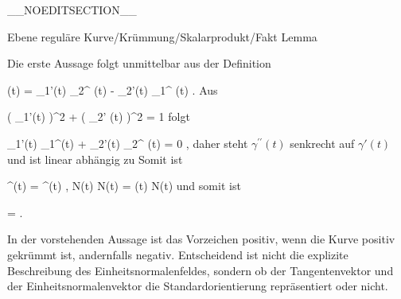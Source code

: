 __NOEDITSECTION__

{Ebene reguläre Kurve/Krümmung/Skalarprodukt/Fakt}
{Lemma}
{}
{

\faktzusatz {}
\faktzusatz {}

}
{

Die erste Aussage folgt unmittelbar aus der Definition

\mavergleichskettedisp
{\vergleichskette
{ \kappa(t)
}
{ =} { \gamma_1'(t) \gamma_2^{\prime \prime} (t) - \gamma_2'(t) \gamma_1^{\prime \prime} (t)
}
{ } {
}
{ } {
}
{ } {
}
}
{}{}{.}
Aus

\mavergleichskettedisp
{\vergleichskette
{ \left(  \gamma_1'(t)  \right)^2 +  \left(  \gamma_2' (t)  \right)^2
}
{ =} { 1
}
{ } {
}
{ } {
}
{ } {
}
}
{}{}{}
folgt

\mavergleichskettedisp
{\vergleichskette
{ \gamma_1'(t) \gamma_1^{\prime \prime}(t) + \gamma_2'(t) \gamma_2^{\prime \prime} (t)
}
{ =} { 0
}
{ } {
}
{ } {
}
{ } {
}
}
{}{}{,}
daher steht $\gamma^{\prime \prime}(t)$ senkrecht auf $\gamma'(t)$ und ist linear abhängig zu
 Somit ist

\mavergleichskettedisp
{\vergleichskette
{ \gamma^{\prime \prime}(t)
}
{ =} { \left\langle  \gamma^{\prime \prime}(t) ,  N(t)  \right\rangle  N(t)
}
{ =} { \kappa(t) N(t)
}
{ } {
}
{ } {
}
}
{}{}{}
und somit ist

\mavergleichskettedisp
{\vergleichskette
{  \Vert
}
{ =} { 
}
{ } {
}
{ } {
}
{ } {
}
}
{}{}{.}

}

In der vorstehenden Aussage ist das Vorzeichen positiv, wenn die Kurve positiv gekrümmt ist, andernfalls negativ. Entscheidend ist nicht die explizite Beschreibung des Einheitsnormalenfeldes, sondern ob der Tangentenvektor und der Einheitsnormalenvektor die Standardorientierung repräsentiert oder nicht.

